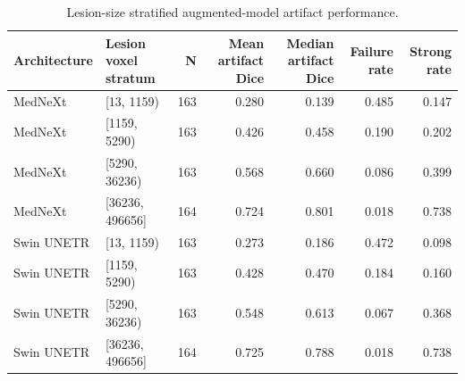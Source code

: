 \begin{table}
\caption{Lesion-size stratified augmented-model artifact performance.}
\label{tab:lesion_augmented}
\begin{tabular}{llrrrrr}
\toprule
Architecture & Lesion voxel stratum & N & Mean artifact Dice & Median artifact Dice & Failure rate & Strong rate \\
\midrule
MedNeXt & [13, 1159) & 163 & 0.280 & 0.139 & 0.485 & 0.147 \\
MedNeXt & [1159, 5290) & 163 & 0.426 & 0.458 & 0.190 & 0.202 \\
MedNeXt & [5290, 36236) & 163 & 0.568 & 0.660 & 0.086 & 0.399 \\
MedNeXt & [36236, 496656] & 164 & 0.724 & 0.801 & 0.018 & 0.738 \\
Swin UNETR & [13, 1159) & 163 & 0.273 & 0.186 & 0.472 & 0.098 \\
Swin UNETR & [1159, 5290) & 163 & 0.428 & 0.470 & 0.184 & 0.160 \\
Swin UNETR & [5290, 36236) & 163 & 0.548 & 0.613 & 0.067 & 0.368 \\
Swin UNETR & [36236, 496656] & 164 & 0.725 & 0.788 & 0.018 & 0.738 \\
\bottomrule
\end{tabular}
\end{table}
